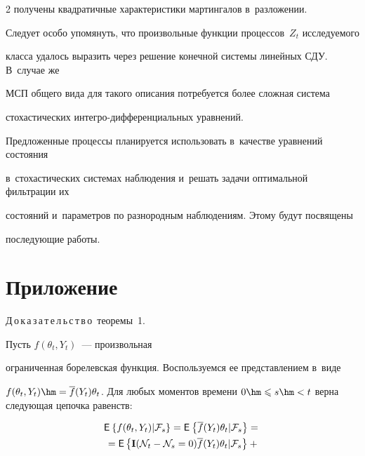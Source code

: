 \begin{multicols}{2}
получены квадратичные характеристики мартингалов в~разложении.





Следует особо упомянуть, что произвольные функции процессов~$Z_t$ исследуемого 


класса удалось выразить через решение конечной сис\-те\-мы линейных СДУ. В~случае же 


МСП общего вида для такого описания потребуется более сложная сис\-те\-ма 


стохастических ин\-тег\-ро-диф\-фе\-рен\-ци\-аль\-ных уравнений.





Предложенные процессы планируется использовать в~качестве уравнений состояния 


в~стохастических сис\-те\-мах наблюдения и~решать задачи оптимальной фильтрации их 


состояний и~па\-ра\-мет\-ров по разнородным наблюдениям. Этому будут посвящены 


последующие работы.








  


{\small \section*{\raggedleft Приложение}


  \noindent


  Д\,о\,к\,а\,з\,а\,т\,е\,л\,ь\,с\,т\,в\,о\  теоремы~1.


Пусть $f(\theta_t,Y_t)$~--- произвольная 


ограниченная борелевская функция. Воспользуемся ее представлением в~виде 


$f(\theta_t,Y_t) \hm= \overline{f}(Y_t)\theta_t$. Для любых моментов времени $0 \hm\leqslant s \hm< t $ верна следующая цепочка равенств:


\begin{multline*}


\me{}{f(\theta_t,Y_t)|\ff_s} =\me{}{\overline{f}(Y_t)\theta_t|\ff_s}={} 


\\


{}={\sf E}\left\{\mathbf{I}(\NII_t - \NII_s = 0)\overline{f}(Y_t)\theta_t|\ff_s\right\} +{}\\



\end{multline*}}
\end{multicols}
